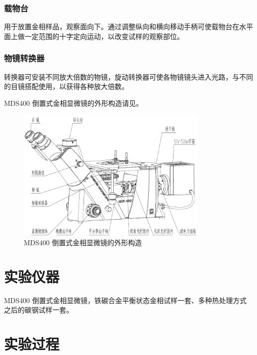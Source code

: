         \subsubsection{载物台}
            用于放置金相样品，观察面向下。通过调整纵向和横向移动手柄可使载物台在水平面上做一定范围的十字定向运动，以改变试样的观察部位。
        \subsubsection{物镜转换器}
            转换器可安装不同放大倍数的物镜，旋动转换器可使各物镜镜头进入光路，与不同的目镜搭配使用，以获得各种放大倍数。
        \par
        MDS400 倒置式金相显微镜的外形构造请见。
        \begin{figure}[!ht]
            \caption{MDS400 倒置式金相显微镜的外形构造\label{fig:MDS400}}
            \includegraphics[width=0.83\textwidth]{img/A1/MDS400.png}
        \end{figure}
\section{实验仪器}%
    MDS400 倒置式金相显微镜，铁碳合金平衡状态金相试样一套、多种热处理方式之后的碳钢试样一套。
\section{实验过程}%
